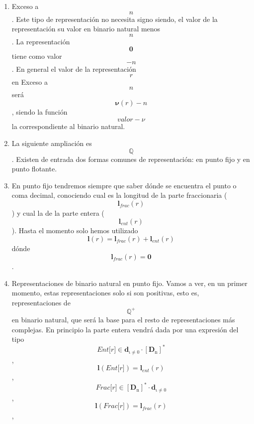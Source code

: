 \begin{enumerate}
\begin{enumerate}
\begin{enumerate}
      Y así queda definido el lenguaje de las representaciones en
      complemento a una base y su semántica de valores en
      \[\mathbb{Z}\].
    \item
      Exceso a \[\mathit{n}\]. Este tipo de representación no necesita
      signo siendo, el valor de la representación su valor en binario
      natural menos \[\mathit{n}\]. La representación
      \[\mathbf{0}\]tiene como valor \[- \mathit{n}\]. En general el
      valor de la representación \[\mathit{r}\] en Exceso a
      \[\mathit{n}\]será \[{\mathbf{\nu}{(\mathit{r})}} - \mathit{n}\],
      siendo la función \[{valor} - \nu\] la correspondiente al
      bina\-rio natural.
    \item
      La siguiente ampliación es \[\mathbb{Q}\]. Existen de entrada dos
      formas comunes de repre\-sentación: en punto fijo y en punto
      flotante.
    \item
      En punto fijo tendremos siempre que saber dónde se encuentra el
      punto o coma deci\-mal, conociendo cual es la longitud de la parte
      fraccionaria
      (\[\mathbf{l}_{\mathbf{\mathrm{\mathit{frac}}}}{(\mathit{r})}\]) y
      cual la de la parte entera
      (\[\mathbf{l}_{\mathbf{\mathrm{\mathit{ent}}}}{(\mathit{r})}\]).
      Hasta el momento solo hemos utilizado
      \[\mathbf{l}{{(\mathit{r})} = \mathbf{l}_{\mathbf{\mathrm{\mathit{frac}}}}}{{(\mathit{r})} + \mathbf{l}_{\mathbf{\mathrm{\mathit{ent}}}}}{(\mathit{r})}\]dónde
      \[\mathbf{l}_{\mathbf{\mathrm{\mathit{frac}}}}{{(\mathit{r})} = \mathbf{0}}\].
    \item
      Representaciones de binario natural en punto fijo. Vamos a ver, en
      un primer mo\-mento, estas representaciones solo si son positivas,
      esto es, representaciones de
      \[\mathbb{Q}^{\mathbf{\mathrm{+}}}\]en binario natural, que será
      la base para el resto de representaciones más com\-plejas. En
      principio la parte entera vendrá dada por una expresión del tipo
      \[\mathit{{Ent}{\lbrack r\rbrack}} \in {\mathbf{d}_{\mathbf{\mathrm{\iota \neq 0}}} \cdot \left\lbrack \mathbf{D}_{\mathbf{\mathrm{n}}} \right\rbrack^{\mathbf{\mathrm{\ast}}}}\],
      \[{\mathbf{l}{(\mathit{{Ent}{\lbrack r\rbrack}})}} = {\mathbf{l}_{\mathbf{\mathrm{\mathit{ent}}}}{(\mathit{r})}}\],
      \[\mathit{{Frac}{\lbrack r\rbrack}} \in {\left\lbrack \mathbf{D}_{\mathbf{\mathrm{n}}} \right\rbrack^{\mathbf{\mathrm{\ast}}} \cdot \mathbf{d}_{\mathbf{\mathrm{\iota \neq 0}}}}\],
      \[{\mathbf{l}{(\mathit{{Frac}{\lbrack r\rbrack}})}} = {\mathbf{l}_{\mathbf{\mathrm{\mathit{frac}}}}{(\mathit{r})}}\],

\end{enumerate}
\end{enumerate}
\end{enumerate}
